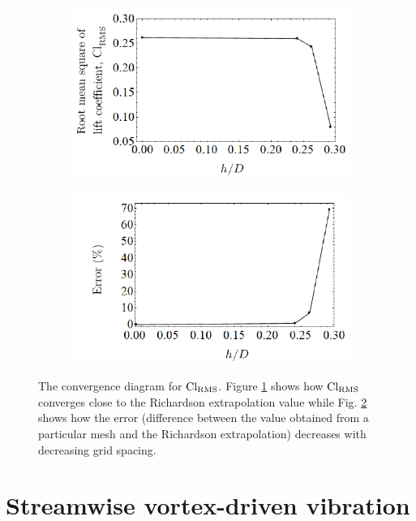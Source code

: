 \documentclass[oneside]{utmthesis}
\begin{document}
\begin{figure}
  \centering
  \begin{subfigure}[h]{0.39\textwidth}
    \includegraphics[width=\textwidth]{figs/gciClrms-1}
    \caption{}
    \label{fig:gciClrms-1}
  \end{subfigure}
  \hspace{6mm}
  \begin{subfigure}[h]{0.39\textwidth}
    \includegraphics[width=\textwidth]{figs/gciClrms-2}
    \caption{}
    \label{fig:gciClrms-2}
  \end{subfigure}
  \caption{The convergence diagram for $\text{Cl}_{\text{RMS}}$. Figure \ref{fig:gciClrms-1} shows how $\text{Cl}_{\text{RMS}}$ converges close to the Richardson extrapolation value while Fig. \ref{fig:gciClrms-2} shows how the error (difference between the value obtained from a particular mesh and the Richardson extrapolation) decreases with decreasing grid spacing.} \label{fig:gciClrms}
\end{figure}


\chapter{Streamwise vortex-driven vibration}\label{chap:svivRegime}
\end{document}
